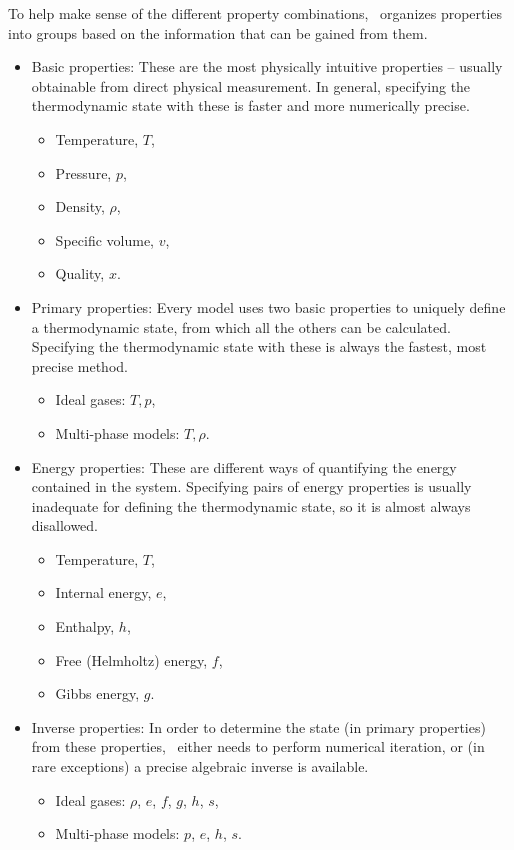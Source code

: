To help make sense of the different property combinations, \PM\ organizes properties into groups based on the information that can be gained from them.
\begin{itemize}
\item Basic properties: These are the most physically intuitive properties -- usually obtainable from direct physical measurement.  In general, specifying the thermodynamic state with these is faster and more numerically precise.
    \begin{itemize}
    \item Temperature, $T$,
    \item Pressure, $p$,
    \item Density, $\rho$,
    \item Specific volume, $v$,
    \item Quality, $x$.
    \end{itemize}
\item Primary properties: Every model uses two basic properties to uniquely define a thermodynamic state, from which all the others can be calculated.  Specifying the thermodynamic state with these is always the fastest, most precise method.
    \begin{itemize}
    \item Ideal gases: $T, p$,
    \item Multi-phase models: $T, \rho$.
    \end{itemize}
\item Energy properties: These are different ways of quantifying the energy contained in the system.  Specifying pairs of energy properties is usually inadequate for defining the thermodynamic state, so it is almost always disallowed.
    \begin{itemize}
    \item Temperature, $T$,
    \item Internal energy, $e$,
    \item Enthalpy, $h$,
    \item Free (Helmholtz) energy, $f$,
    \item Gibbs energy, $g$.
    \end{itemize}
\item Inverse properties: In order to determine the state (in primary properties) from these properties, \PM\ either needs to perform numerical iteration, or (in rare exceptions) a precise algebraic inverse is available.
    \begin{itemize}
    \item Ideal gases: $\rho$, $e$, $f$, $g$, $h$, $s$,
    \item Multi-phase models: $p$, $e$, $h$, $s$.
    \end{itemize}
\end{itemize}

